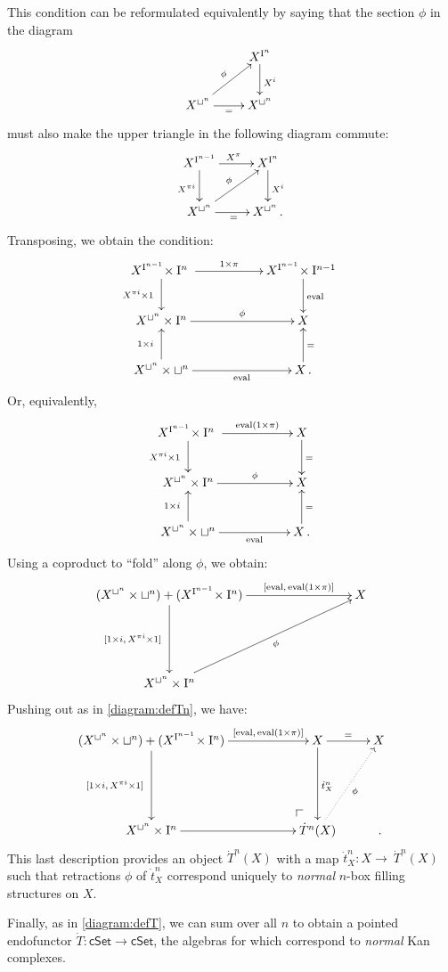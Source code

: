 \documentclass[12pt]{article}
\makeatletter
\newcommand{\cSet}{\ensuremath{\mathsf{cSet}}}
\newcommand{\pocorner}[1][dr]{\save*!/#1+2pc/#1:(2,-2)@^{|-}\restore}
\newcommand{\eval}{\ensuremath{\mathrm{eval}}}
\newcommand{\I}{\ensuremath{\mathrm{I}}}
\theoremstyle{remark}
\theoremstyle{definition}
\makeatother
\begin{document}
This condition can be reformulated equivalently by saying that the section $\phi$ in the diagram
\[
\xymatrix{
& X^{ \I^n } \ar[d]^{X^{i}}\\
X^{\sqcup^n} \ar[ru]^{\phi} \ar[r]_= & X^{\sqcup^n} 
}
\]
must also make the upper triangle in the following diagram commute:
\[
\xymatrix{
X^{\I^{n-1}} \ar[d]_{X^{\pi i}} \ar[r]^{X^\pi} & X^{ \I^n } \ar[d]^{X^{i}}\\
X^{\sqcup^n} \ar[ru]^{\phi} \ar[r]_= & X^{\sqcup^n} \,.
}
\]
Transposing, we obtain the condition:
\[
\xymatrix{
{X^{\I^{n-1}}\!\times\I^{n}\ } 	\ar[d]_-{X^{{\pi}i} \times 1\ } \ar[rr]^-{1\times\pi} && {X^{\I^{n-1}}\!\times\I^{n-1}\ } \ar[d]^{\eval} \\ 
X^{\sqcup^n}\times\I^{n}		\ar[rr]^-{\phi} 	&& X \\
X^{\sqcup^n}\times\sqcup^n 	\ar[u]^-{1\times i\ } 	\ar[rr]_-{\eval} && X \ar[u]_{=} \,.
}
\]
Or, equivalently,
\[
\xymatrix{
{X^{\I^{n-1}}\!\times\I^{n}\ } 	\ar[d]_-{X^{{\pi}i} \times 1\ } \ar[rr]^-{\eval(1\times\pi)} && X \ar[d]^{=} \\ 
X^{\sqcup^n}\times\I^{n}		\ar[rr]^-{\phi} 	&& X \\
X^{\sqcup^n}\times\sqcup^n  	\ar[u]^-{1\times i\ } \ar[rr]_-{\eval} && X \ar[u]_= \,.
}
\]
Using a coproduct to ``fold'' along $\phi$, we obtain:
\[
\xymatrix{
(X^{\sqcup^n}\times\sqcup^n) + (X^{\I^{n-1}}\!\times\I^{n}) \ar[dd]_-{[1\times i,\,X^{{\pi}i} \times 1]\ } \ar[rrr]^-{[\eval,\,\eval(1\times\pi)]} 
									&&& X \\ 
									&&&\\
X^{\sqcup^n}\times\I^{n}		\ar[rrruu]_-{\phi} 	&&& 
}
\]
Pushing out as in \eqref{diagram:defTn}, we have:
\begin{equation}\label{diag:defTdotn}
\xymatrix{
(X^{\sqcup^n}\times\sqcup^n) + (X^{\I^{n-1}}\!\times\I^{n}) \ar[dd]_-{[1\times i,\,X^{{\pi}i} \times 1]\ } \ar[rr]^-{[\eval,\,\eval(1\times\pi)]} 
									&& X \ar[dd]^{\dot{t}^n_X} \ar[r]^{=} & X\\
									&&&\\
X^{\sqcup^n}\times\I^{n}	\ar[rr] && {\pocorner} \dot{T}^n(X) \ar@{..>}[uur]_{\phi} & \,.
}
\end{equation}
This last description provides an object $\dot{T}^n(X)$ with a map $\dot{t}^n_X : X\to\ \dot{T}^n(X)$ such that retractions $\phi$ of $\dot{t}^n_X$ correspond uniquely to \emph{normal} $n$-box filling structures on $X$.  

Finally, as in \eqref{diagram:defT}, we can sum over all $n$ to obtain a pointed endofunctor $\dot{T} :\cSet\to\cSet$, the algebras for which correspond to \emph{normal} Kan complexes.
\end{document}
